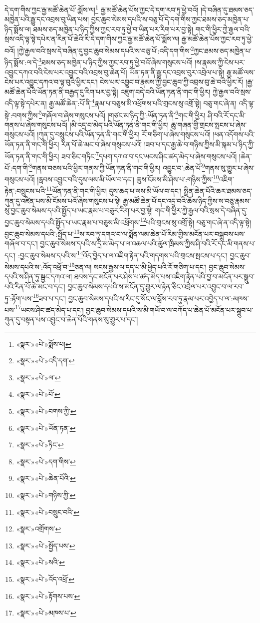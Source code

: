 དེ་དག་གིས་ཀྱང་རྒྱ་མཚོ་ཆེན་པོ་:སྨོས་ལ།\footnote{«སྣར་»«པེ་»སྨོས་པ།} རྒྱ་མཚོ་ཆེན་པོས་ཀྱང་དེ་དག་རབ་ཏུ་ཕྱེ་བའོ། །དེ་བཞིན་དུ་ཐམས་ཅད་མཁྱེན་པའི་རྒྱུ་དང་འབྲས་བུ་ཡིན་པས། བྱང་ཆུབ་སེམས་དཔའི་ས་བཅུ་པོ་དེ་དག་གིས་ཀྱང་ཐམས་ཅད་མཁྱེན་པ་ཉིད་སྨོས་ལ། ཐམས་ཅད་མཁྱེན་པ་ཉིད་ཀྱིས་ཀྱང་རབ་ཏུ་ཕྱེ་བ་ཡིན་པར་རིག་པར་བྱ་སྟེ། གང་གི་ཕྱིར་ཀྱེ་རྒྱལ་བའི་སྲས་འདི་ལྟ་སྟེ་དཔེར་ན་རིན་པོ་ཆེའི་རི་དེ་དག་གིས་ཀྱང་རྒྱ་མཚོ་ཆེན་པོ་སྨོས་ལ། རྒྱ་མཚོ་ཆེན་པོས་ཀྱང་རབ་ཏུ་ཕྱེ་བའོ། །ཀྱེ་རྒྱལ་བའི་སྲས་དེ་བཞིན་དུ་བྱང་ཆུབ་སེམས་དཔའི་ས་བཅུ་པོ་:འདི་དག་གིས་\footnote{«སྣར་»«པེ་»འདི་དག་}ཀྱང་ཐམས་ཅད་མཁྱེན་པ་ཉིད་སྨོས་:ལ་དེ་\footnote{«སྣར་»«པེ་»ལ་}ཐམས་ཅད་མཁྱེན་པ་ཉིད་ཀྱིས་ཀྱང་རབ་ཏུ་ཕྱེ་བའོ་ཞེས་གསུངས་པའོ། །ས་རྣམས་ཀྱི་ངེས་པར་འབྱུང་དཀའ་བའི་ངེས་པར་འབྱུང་བའི་འབྲས་བུ་ཆེན་པོ། ཡོན་ཏན་ནི་རྒྱུ་དང་འབྲས་བུར་འབྲེལ་པ་སྟེ། རྒྱ་མཚོ་ལས་ངེས་པར་འབྱུང་དཀའ་བ་ལྟ་བུའི་ཕྱིར་དང་། ངེས་པར་འབྱུང་བ་རྣམས་ཀྱི་བྱང་ཆུབ་ཀྱི་འབྲས་བུ་ཆེ་བའི་ཕྱིར་རོ། །རྒྱ་མཚོ་ཆེན་པོའི་ཡོན་ཏན་ནི་བརྒྱད་དུ་རིག་པར་བྱ་སྟེ། འཇུག་བདེ་བའི་ཡོན་ཏན་ནི་གང་གི་ཕྱིར། ཀྱེ་རྒྱལ་བའི་སྲས་འདི་ལྟ་སྟེ་དཔེར་ན། རྒྱ་མཚོ་ཆེན་:པོ་ནི་\footnote{«སྣར་»«པེ་»པོ་}རྣམ་པ་བཅུས་མི་འཕྲོགས་པའི་གྲངས་སུ་འགྲོ་སྟེ། བཅུ་གང་ཞེ་ན། འདི་ལྟ་སྟེ་:བགས་ཀྱིས་\footnote{«སྣར་»«པེ་»བགས་ཀྱི་}གཞོལ་བ་ཞེས་གསུངས་པའོ། །གཙང་མ་ཉིད་ཀྱི་:ཡོན་ཏན་ནི་\footnote{«སྣར་»«པེ་»ཡོན་ཏན་}གང་གི་ཕྱིར། ཤི་བའི་རོ་དང་མི་གནས་པ་ཞེས་གསུངས་པའོ། །མི་འདྲ་བ་མེད་པའི་ཡོན་ཏན་ནི་གང་གི་ཕྱིར། ཆུ་གཞན་གྱི་གྲངས་སྤངས་པ་ཞེས་གསུངས་པའོ། །ཀུན་དུ་བསྲུངས་པའི་ཡོན་ཏན་ནི་གང་གི་ཕྱིར། རོ་གཅིག་པ་ཞེས་གསུངས་པའོ། །ཕན་འདོགས་པའི་ཡོན་ཏན་ནི་གང་གི་ཕྱིར། རིན་པོ་ཆེ་མང་བ་ཞེས་གསུངས་པའོ། །ཟབ་པ་དང་རྒྱ་ཆེ་བ་གཉིས་ཀྱིས་མི་སྐམ་པ་ཉིད་ཀྱི་ཡོན་ཏན་ནི་གང་གི་ཕྱིར། ཟབ་ཅིང་གཏིང་\footnote{«སྣར་»«པེ་»ཏིང་}དཔག་དཀའ་བ་དང་ཡངས་ཤིང་ཚད་མེད་པ་ཞེས་གསུངས་པའོ། །ཆེན་པོ་:དག་གི་\footnote{«སྣར་»«པེ་»དག་གིས་}གནས་བཅས་པའི་ཕྱིར་གནས་ཀྱི་ཡོན་ཏན་ནི་གང་གི་ཕྱིར། འབྱུང་བ་:ཆེན་པོ་\footnote{«སྣར་»«པེ་»ཆེན་པོའི་}གནས་སུ་གྱུར་པ་ཞེས་གསུངས་པའོ། །རླབས་འབྱུང་བའི་དུས་ལས་མི་ཡོལ་བ་དང་། ཆུས་ངོམས་མི་ཤེས་པ་:གཉིས་ཀྱིས་\footnote{«སྣར་»«པེ་»གཉིས་ཀྱི་}འཇིག་རྟེན་:བསྲུངས་པའི་\footnote{«སྣར་»«པེ་»བསྲུང་བའི་}ཡོན་ཏན་ནི་གང་གི་ཕྱིར། དུས་ཆད་པ་ལས་མི་ཡོལ་བ་དང་། སྤྲིན་ཆེན་པོའི་ཆར་ཐམས་ཅད་ཀུན་དུ་འཛིན་པས་མི་ངོམས་པའོ་ཞེས་གསུངས་པ་སྟེ། རྒྱ་མཚོ་ཆེན་པོ་དང་འདྲ་བའི་ཆོས་ཉིད་ཀྱིས་ས་བཅུ་རྣམས་སུ་བྱང་ཆུབ་སེམས་དཔའི་སྤྱོད་པ་ཡང་རྣམ་པ་བཅུར་རིག་པར་བྱ་སྟེ། གང་གི་ཕྱིར་ཀྱེ་རྒྱལ་བའི་སྲས་དེ་བཞིན་དུ་བྱང་ཆུབ་སེམས་དཔའི་སྤྱོད་པ་ཡང་རྣམ་པ་བཅུས་མི་འཕྲོགས་\footnote{«སྣར་»འགྲོགས་}པའི་གྲངས་སུ་འགྲོ་སྟེ། བཅུ་གང་ཞེ་ན་འདི་ལྟ་སྟེ། བྱང་ཆུབ་སེམས་དཔའི་:སྤྱོད་པ་\footnote{«སྣར་»«པེ་»སྤྱོད་པས་}ས་རབ་ཏུ་དགའ་བ་ལ་སྨོན་ལམ་ཆེན་པོ་རིམ་གྱིས་མངོན་པར་བསྒྲུབས་པས་གཞོལ་བ་དང་། བྱང་ཆུབ་སེམས་དཔའི་ས་དྲི་མ་མེད་པ་ལ་འཆལ་པའི་ཚུལ་ཁྲིམས་ཀྱིས་ཤི་བའི་རོ་དང་མི་གནས་པ་དང་། :བྱང་ཆུབ་སེམས་དཔའི་ས་\footnote{«སྣར་»«པེ་»སའི་}འོད་བྱེད་པ་ལ་འཇིག་རྟེན་པའི་གདགས་པའི་གྲངས་སྤངས་པ་དང་། བྱང་ཆུབ་སེམས་དཔའི་ས་:འོད་འཕྲོ་བ་\footnote{«སྣར་»«པེ་»འོད་འཕྲོ་}ཅན་ལ། སངས་རྒྱས་ལ་དད་པ་མི་ཕྱེད་པའི་རོ་གཅིག་པ་དང་། བྱང་ཆུབ་སེམས་དཔའི་ས་ཤིན་ཏུ་སྦྱང་དཀའ་ལ། ཐབས་དང་མངོན་པར་ཤེས་པ་ཚད་མེད་པས་འཇིག་རྟེན་པའི་བྱ་བ་མངོན་པར་སྒྲུབ་པའི་རིན་པོ་ཆེ་མང་བ་དང་། བྱང་ཆུབ་སེམས་དཔའི་ས་མངོན་དུ་གྱུར་ལ་རྟེན་ཅིང་འབྲེལ་པར་འབྱུང་བ་ལ་རབ་ཏུ་:རྟོག་པས་\footnote{«སྣར་»«པེ་»རྟོགས་པས་}ཟབ་པ་དང་། བྱང་ཆུབ་སེམས་དཔའི་ས་རིང་དུ་སོང་ལ་བློས་རབ་ཏུ་རྣམ་པར་འབྱེད་པ་ལ་:མཁས་པས་\footnote{«སྣར་»«པེ་»མཁས་པ་}ཡངས་ཤིང་ཚད་མེད་པ་དང་། བྱང་ཆུབ་སེམས་དཔའི་ས་མི་གཡོ་བ་ལ་བཀོད་པ་ཆེན་པོ་མངོན་པར་སྒྲུབ་པ་ཀུན་དུ་བསྟན་པས་འབྱུང་བ་ཆེན་པོའི་གནས་སུ་གྱུར་པ་དང་། 